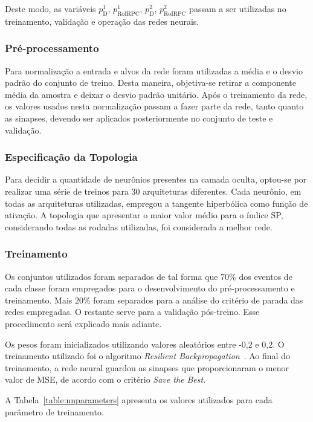Deste modo, as variáveis $p^1_\text{D}$, $p^1_\text{RoIRPC}$, $p^2_\text{D}$,
$p^2_\text{RoIRPC}$ passam a ser utilizadas no treinamento, validação e operação
das redes neurais.

\subsubsection{Pré-processamento}

Para normalização a entrada e alvos da rede foram utilizadas a média e o desvio
padrão do conjunto de treino. Desta maneira, objetiva-se retirar a componente
média da amostra e deixar o desvio padrão unitário. Após o treinamento da rede,
os valores usados nesta normalização passam a fazer parte da rede, tanto quanto
as sinapses, devendo ser aplicados posteriormente no conjunto de teste e
validação.


\subsubsection{Especificação da Topologia}

Para decidir a quantidade de neurônios presentes na camada oculta, optou-se por
realizar uma série de treinos para 30 arquiteturas diferentes. Cada neurônio,
em todas as arquiteturas utilizadas, empregou a tangente hiperbólica como
função de ativação. A topologia que apresentar o maior valor médio para o índice
SP, considerando todas as rodadas utilizadas, foi considerada a melhor rede.

\subsubsection{Treinamento}

Os conjuntos utilizados foram separados de tal forma que 70\% dos eventos de
cada classe foram empregados para o desenvolvimento do pré-processamento e
treinamento. Mais 20\% foram separados para a análise do critério de
parada das redes empregadas. O restante serve para a validação pós-treino. Esse
procedimento será explicado mais adiante.

Os pesos foram inicializados utilizando valores aleatórios entre -0,2 e 0,2. O
treinamento utilizado foi o algoritmo \emph{Resilient
Backpropagation}~\cite{RIEDMILLER1993}. Ao final do treinamento, a rede neural
guardou as sinapses que proporcionaram o menor valor de MSE, de acordo com o
critério \emph{Save the Best}.

A Tabela~\ref{table:nnparameters} apresenta os valores utilizados para cada
parâmetro de treinamento.


